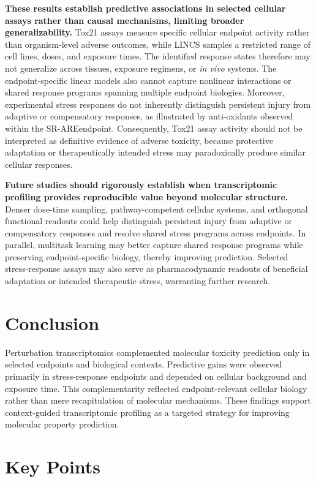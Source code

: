 \documentclass[11pt,a4paper]{article}
\begin{document}
\textbf{These results establish predictive associations in selected cellular
assays rather than causal mechanisms, limiting broader generalizability.}
Tox21 assays measure specific cellular endpoint activity rather than
organism-level adverse outcomes, while LINCS samples a restricted range of
cell lines, doses, and exposure times. The identified response states therefore
may not generalize across tissues, exposure regimens, or \textit{in vivo}
systems. The endpoint-specific linear models also cannot capture nonlinear
interactions or shared response programs spanning multiple endpoint biologies.
Moreover, experimental stress responses do not inherently distinguish
persistent injury from adaptive or compensatory responses, as illustrated by
anti-oxidants observed within the SR-ARE\@ endpoint. Consequently, Tox21 assay
activity should not be interpreted as definitive evidence of adverse toxicity,
because protective adaptation or therapeutically intended stress may
paradoxically produce similar cellular responses.

\textbf{Future studies should rigorously establish when transcriptomic profiling
provides reproducible value beyond molecular structure.}
Denser dose-time sampling, pathway-competent cellular systems, and orthogonal
functional readouts could help distinguish persistent injury from adaptive or
compensatory responses and resolve shared stress programs across endpoints.
In parallel, multitask learning may better capture shared response programs
while preserving endpoint-specific biology, thereby improving prediction.
Selected stress-response assays may also serve as pharmacodynamic readouts of
beneficial adaptation or intended therapeutic stress, warranting further research.

\section{Conclusion}

Perturbation transcriptomics complemented molecular toxicity prediction only
in selected endpoints and biological contexts. Predictive gains were observed
primarily in stress-response endpoints and depended on cellular background and
exposure time. This complementarity reflected endpoint-relevant cellular
biology rather than mere recapitulation of molecular mechanisms. These
findings support context-guided transcriptomic profiling as a targeted strategy
for improving molecular property prediction.

\section*{Key Points}
\end{document}
